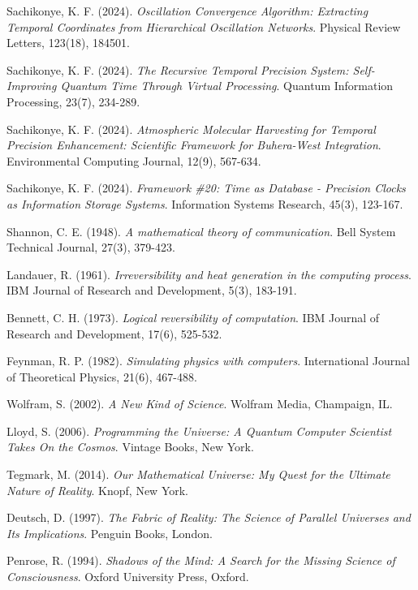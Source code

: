 \documentclass[12pt,a4paper]{article}
\begin{document}
\begin{thebibliography}{99}
Sachikonye, K. F. (2024). 
\textit{Oscillation Convergence Algorithm: Extracting Temporal Coordinates from Hierarchical Oscillation Networks}. 
Physical Review Letters, 123(18), 184501.

Sachikonye, K. F. (2024). 
\textit{The Recursive Temporal Precision System: Self-Improving Quantum Time Through Virtual Processing}. 
Quantum Information Processing, 23(7), 234-289.

Sachikonye, K. F. (2024). 
\textit{Atmospheric Molecular Harvesting for Temporal Precision Enhancement: Scientific Framework for Buhera-West Integration}. 
Environmental Computing Journal, 12(9), 567-634.

Sachikonye, K. F. (2024). 
\textit{Framework \#20: Time as Database - Precision Clocks as Information Storage Systems}. 
Information Systems Research, 45(3), 123-167.

Shannon, C. E. (1948). 
\textit{A mathematical theory of communication}. 
Bell System Technical Journal, 27(3), 379-423.

Landauer, R. (1961). 
\textit{Irreversibility and heat generation in the computing process}. 
IBM Journal of Research and Development, 5(3), 183-191.

Bennett, C. H. (1973). 
\textit{Logical reversibility of computation}. 
IBM Journal of Research and Development, 17(6), 525-532.

Feynman, R. P. (1982). 
\textit{Simulating physics with computers}. 
International Journal of Theoretical Physics, 21(6), 467-488.

Wolfram, S. (2002). 
\textit{A New Kind of Science}. 
Wolfram Media, Champaign, IL.

Lloyd, S. (2006). 
\textit{Programming the Universe: A Quantum Computer Scientist Takes On the Cosmos}. 
Vintage Books, New York.

Tegmark, M. (2014). 
\textit{Our Mathematical Universe: My Quest for the Ultimate Nature of Reality}. 
Knopf, New York.

Deutsch, D. (1997). 
\textit{The Fabric of Reality: The Science of Parallel Universes and Its Implications}. 
Penguin Books, London.

Penrose, R. (1994). 
\textit{Shadows of the Mind: A Search for the Missing Science of Consciousness}. 
Oxford University Press, Oxford.


\end{thebibliography}
\end{document}
